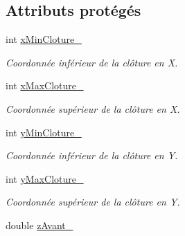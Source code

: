 \subsection*{Attributs protégés}
\begin{DoxyCompactItemize}
\item 
\hypertarget{classvue_1_1_projection_ab72f1930aa81faf98b2a9cb60f54af33}{int \hyperlink{classvue_1_1_projection_ab72f1930aa81faf98b2a9cb60f54af33}{x\-Min\-Cloture\-\_\-}}\label{classvue_1_1_projection_ab72f1930aa81faf98b2a9cb60f54af33}

\begin{DoxyCompactList}\small\item\em Coordonnée inférieur de la clôture en X. \end{DoxyCompactList}\item 
\hypertarget{classvue_1_1_projection_abaed989322960f44c619b5a22e51dc22}{int \hyperlink{classvue_1_1_projection_abaed989322960f44c619b5a22e51dc22}{x\-Max\-Cloture\-\_\-}}\label{classvue_1_1_projection_abaed989322960f44c619b5a22e51dc22}

\begin{DoxyCompactList}\small\item\em Coordonnée supérieur de la clôture en X. \end{DoxyCompactList}\item 
\hypertarget{classvue_1_1_projection_a347192bd39c5ba331e97061f797ed3f0}{int \hyperlink{classvue_1_1_projection_a347192bd39c5ba331e97061f797ed3f0}{y\-Min\-Cloture\-\_\-}}\label{classvue_1_1_projection_a347192bd39c5ba331e97061f797ed3f0}

\begin{DoxyCompactList}\small\item\em Coordonnée inférieur de la clôture en Y. \end{DoxyCompactList}\item 
\hypertarget{classvue_1_1_projection_a6f60c6c82b2c79d647fde24fbe67b23c}{int \hyperlink{classvue_1_1_projection_a6f60c6c82b2c79d647fde24fbe67b23c}{y\-Max\-Cloture\-\_\-}}\label{classvue_1_1_projection_a6f60c6c82b2c79d647fde24fbe67b23c}

\begin{DoxyCompactList}\small\item\em Coordonnée supérieur de la clôture en Y. \end{DoxyCompactList}\item 
\hypertarget{classvue_1_1_projection_a7decea4d1b5a891a9457f4ef00575e27}{double \hyperlink{classvue_1_1_projection_a7decea4d1b5a891a9457f4ef00575e27}{z\-Avant\-\_\-}}\label{classvue_1_1_projection_a7decea4d1b5a891a9457f4ef00575e27}


\end{DoxyCompactItemize}
